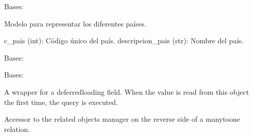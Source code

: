 \documentclass[letterpaper,10pt,spanish]{sphinxmanual}
\begin{document}
\begin{fulllineitems}

\pysigstartsignatures
{}
\pysigstopsignatures
\sphinxAtStartPar
Bases: 

\sphinxAtStartPar
Modelo para representar los diferentes países.
\begin{description}
\sphinxAtStartPar
c\_pais (int): Código único del país.
descripcion\_pais (str): Nombre del país.

\end{description}


\begin{fulllineitems}

\pysigstartsignatures
{}
\pysigstopsignatures
\sphinxAtStartPar
Bases: 

\end{fulllineitems}



\begin{fulllineitems}

\pysigstartsignatures
{}
\pysigstopsignatures
\sphinxAtStartPar
Bases: 

\end{fulllineitems}



\begin{fulllineitems}

\pysigstartsignatures
{}
\pysigstopsignatures
\sphinxAtStartPar
A wrapper for a deferred\sphinxhyphen{}loading field. When the value is read from this
object the first time, the query is executed.

\end{fulllineitems}



\begin{fulllineitems}

\pysigstartsignatures
{}
\pysigstopsignatures
\sphinxAtStartPar
Accessor to the related objects manager on the reverse side of a
many\sphinxhyphen{}to\sphinxhyphen{}one relation.


\end{fulllineitems}
\end{fulllineitems}
\end{document}
